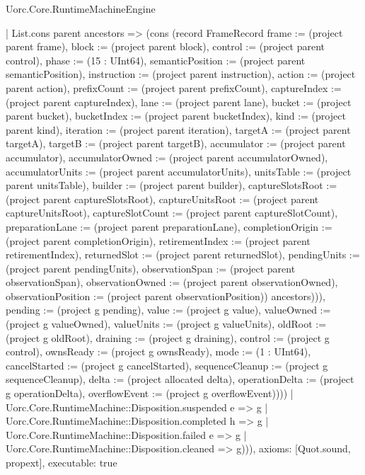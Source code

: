 \begin{lexlean}{Uorc.Core.RuntimeMachineEngine}
\begin{semanticmodule}
{{          | List.cons parent ancestors => (cons (record FrameRecord {frame := (project parent frame), block := (project parent block), control := (project parent control), phase := (15 : UInt64), semanticPosition := (project parent semanticPosition), instruction := (project parent instruction), action := (project parent action), prefixCount := (project parent prefixCount), captureIndex := (project parent captureIndex), lane := (project parent lane), bucket := (project parent bucket), bucketIndex := (project parent bucketIndex), kind := (project parent kind), iteration := (project parent iteration), targetA := (project parent targetA), targetB := (project parent targetB), accumulator := (project parent accumulator), accumulatorOwned := (project parent accumulatorOwned), accumulatorUnits := (project parent accumulatorUnits), unitsTable := (project parent unitsTable), builder := (project parent builder), captureSlotsRoot := (project parent captureSlotsRoot), captureUnitsRoot := (project parent captureUnitsRoot), captureSlotCount := (project parent captureSlotCount), preparationLane := (project parent preparationLane), completionOrigin := (project parent completionOrigin), retirementIndex := (project parent retirementIndex), returnedSlot := (project parent returnedSlot), pendingUnits := (project parent pendingUnits), observationSpan := (project parent observationSpan), observationOwned := (project parent observationOwned), observationPosition := (project parent observationPosition)}) ancestors))), pending := (project g pending), value := (project g value), valueOwned := (project g valueOwned), valueUnits := (project g valueUnits), oldRoot := (project g oldRoot), draining := (project g draining), control := (project g control), ownsReady := (project g ownsReady), mode := (1 : UInt64), cancelStarted := (project g cancelStarted), sequenceCleanup := (project g sequenceCleanup), delta := (project allocated delta), operationDelta := (project g operationDelta), overflowEvent := (project g overflowEvent)})))
      | Uorc.Core.RuntimeMachine::Disposition.suspended e => g
      | Uorc.Core.RuntimeMachine::Disposition.completed h => g
      | Uorc.Core.RuntimeMachine::Disposition.failed e => g
      | Uorc.Core.RuntimeMachine::Disposition.cleaned => g))),
  axioms: [Quot.sound, propext],
  executable: true
}


\end{semanticmodule}
\end{lexlean}
